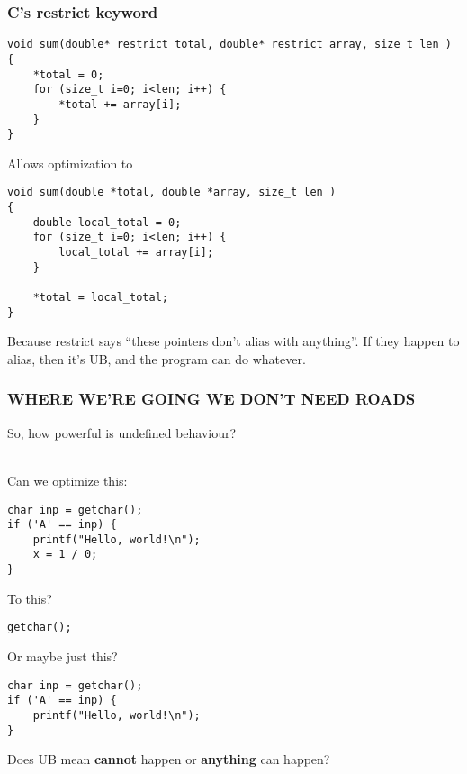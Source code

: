 \documentclass[handout]{beamer}
\begin{document}
\begin{frame}[fragile]
  \frametitle{C's restrict keyword}

\begin{lstlisting}
void sum(double* restrict total, double* restrict array, size_t len )
{
    *total = 0;
    for (size_t i=0; i<len; i++) {
        *total += array[i];
    }
}
\end{lstlisting}

  Allows optimization to

\begin{lstlisting}
void sum(double *total, double *array, size_t len )
{
    double local_total = 0;
    for (size_t i=0; i<len; i++) {
        local_total += array[i];
    }

    *total = local_total;
}
\end{lstlisting}

  Because restrict says ``these pointers don't alias with
  anything''. If they happen to alias, then it's UB, and the program
  can do whatever.

\end{frame}

\begin{frame}
  \frametitle{WHERE WE'RE GOING WE DON'T NEED ROADS}

  \pause
  So, how powerful is undefined behaviour?\\~

  \pause
  Can we optimize this:

\begin{lstlisting}
char inp = getchar();
if ('A' == inp) {
    printf("Hello, world!\n");
    x = 1 / 0;
}
\end{lstlisting}

  \pause

  To this?

\begin{lstlisting}
getchar();
\end{lstlisting}

  \pause

  Or maybe just this?

\begin{lstlisting}
char inp = getchar();
if ('A' == inp) {
    printf("Hello, world!\n");
}
\end{lstlisting}

  \pause

  Does UB mean {\bf cannot} happen or {\bf anything} can happen?

\end{frame}
\end{document}
